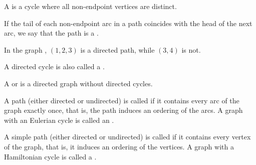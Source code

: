 \begin{definition}
\begin{defenum}
    A  is a cycle where all non-endpoint vertices are distinct.

    \cite[chapter 1, section 3.2]{Gondran1984} If the tail of each non-endpoint arc in a path coincides with the head of the next arc, we say that the path is a .

    In the graph , \( (1, 2, 3) \) is a directed path, while \( (3, 4) \) is not.

    A directed cycle is also called a .

    \cite[231]{Erickson2019} A  or  is a directed graph without directed cycles.

    \cite[chapter 8, section 1.1]{Gondran1984} A path (either directed or undirected) is called  if it contains every arc of the graph exactly once, that is, the path induces an ordering of the arcs. A graph with an Eulerian cycle is called an .

    \cite[chapter 8, section 3.1]{Gondran1984} A simple path (either directed or undirected) is called  if it contains every vertex of the graph, that is, it induces an ordering of the vertices. A graph with a Hamiltonian cycle is called a .
  \end{defenum}
\end{definition}


